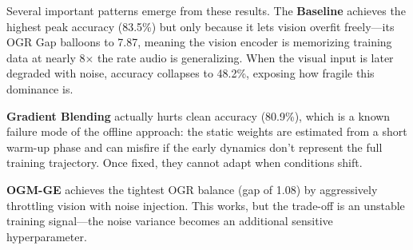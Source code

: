 \documentclass[10pt, twocolumn, letterpaper]{article}
\begin{document}
\begin{table}[h]
\centering
{}
\caption{\textbf{Quantitative Benchmark Results.} Best validation accuracy, OGR Gap (the absolute difference between Vision and Audio OGR averaged over the final 5 epochs—lower means more balanced), and Robustness (accuracy when Gaussian noise $\sigma{=}1.0$ is injected into visual inputs). All numbers are from a controlled single-run experiment on the synthetic CIFAR-10/CREMA-D feature benchmark. MFC reduces the imbalance gap by \textbf{32\%} over the naive baseline and matches OGM-GE's robustness without any noise injection.}
\label{tab:results}
\end{table}

Several important patterns emerge from these results. The \textbf{Baseline} achieves the highest peak accuracy (83.5\%) but only because it lets vision overfit freely—its OGR Gap balloons to 7.87, meaning the vision encoder is memorizing training data at nearly 8$\times$ the rate audio is generalizing. When the visual input is later degraded with noise, accuracy collapses to 48.2\%, exposing how fragile this dominance is.

\textbf{Gradient Blending} actually hurts clean accuracy (80.9\%), which is a known failure mode of the offline approach: the static weights are estimated from a short warm-up phase and can misfire if the early dynamics don't represent the full training trajectory. Once fixed, they cannot adapt when conditions shift.

\textbf{OGM-GE} achieves the tightest OGR balance (gap of 1.08) by aggressively throttling vision with noise injection. This works, but the trade-off is an unstable training signal—the noise variance becomes an additional sensitive hyperparameter.
\end{document}
